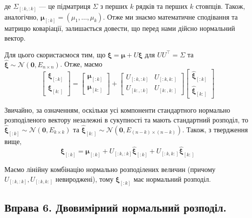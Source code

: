 \documentclass{hw_template}
\begin{document}
де $\Sigma_{[:k,:k]}$ --- це підматриця $\Sigma$ з перших $k$ рядків та перших $k$ стовпців. Також, аналогічно, $\boldsymbol{\mu}_{[:k]} = (\mu_1,\dots,\mu_k)$. Отже ми знаємо математичне сподівання та матрицю коваріації, залишається довести, що перед нами дійсно нормальний вектор.

Для цього скористаємося тим, що $\boldsymbol{\xi} = \boldsymbol{\mu} + U\hat{\boldsymbol{\xi}}$ для $UU^{\top}=\Sigma$ та $\hat{\boldsymbol{\xi}} \sim \mathcal{N}(\mathbf{0}, E_{n \times n})$. Отже, маємо
\begin{equation*}
    \begin{bmatrix}
        \boldsymbol{\xi}_{[:k]} \\
        \boldsymbol{\xi}_{[k:]}
    \end{bmatrix} = \begin{bmatrix}
        \boldsymbol{\mu}_{[:k]} \\
        \boldsymbol{\mu}_{[k:]}
    \end{bmatrix} + \begin{bmatrix}
        U_{[:k,:k]} & U_{[:k,k:]} \\
        U_{[k:,:k]} & U_{[k:,k:]}
    \end{bmatrix} \begin{bmatrix}
        \hat{\boldsymbol{\xi}}_{[:k]} \\
        \hat{\boldsymbol{\xi}}_{[k:]}
    \end{bmatrix}
\end{equation*}

Звичайно, за означенням, оскільки усі компоненти стандартного нормально розподіленого вектору незалежні в сукупності та мають стандартний розподіл, то $\hat{\boldsymbol{\xi}}_{[:k]} \sim \mathcal{N}(\mathbf{0}, E_{k \times k})$ та $\hat{\boldsymbol{\xi}}_{[k:]} \sim \mathcal{N}(\mathbf{0}, E_{(n-k)\times (n-k)})$. Також, з твердження вище,
\begin{equation*}
    \boldsymbol{\xi}_{[:k]} = \boldsymbol{\mu}_{[:k]} + U_{[:k,:k]}\hat{\boldsymbol{\xi}}_{[:k]} + U_{[:k,k:]}\hat{\boldsymbol{\xi}}_{[k:]}
\end{equation*}

Маємо лінійну комбінацію нормально розподілених величин (причому $U_{[:k,:k]},U_{[:k,k:]}$ невироджені), тому $\boldsymbol{\xi}_{[:k]}$ має нормальний розподіл.

\pagebreak

\subsection{Вправа 6. Двовимірний нормальний розподіл.}
\end{document}
